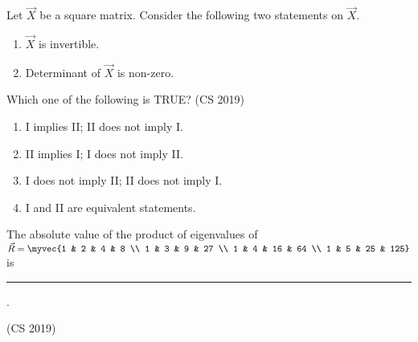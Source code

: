 \item Let $\vec{X}$ be a square matrix. Consider the following two statements on $\vec{X}$.  
	\begin{enumerate}[label=\Roman*.]
		\item $\vec{X}$ is invertible.  
		\item  Determinant of $\vec{X}$ is non-zero.  
	\end{enumerate}
Which one of the following is TRUE? \hfill {(CS 2019)}
\begin{enumerate} 
\item I implies II; II does not imply I.
\item II implies I; I does not imply II.
\item I does not imply II; II does not imply I.
\item I and II are equivalent statements.
\end{enumerate}
\item 
The absolute value of the product of eigenvalues of 
$
\vec{R} =
\myvec{1 & 2 & 4 & 8 \\
1 & 3 & 9 & 27 \\
1 & 4 & 16 & 64 \\
1 & 5 & 25 & 125}
$
is \rule{1cm}{0.01pt}.

\hfill {(CS 2019)}

